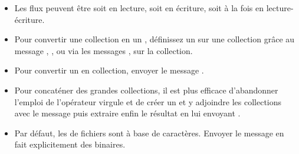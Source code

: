 \documentclass[a4paper,10pt,twoside]{book}
\begin{document}
\begin{itemize}
  \item Les flux peuvent \^etre soit en lecture, soit en écriture, soit \`a la fois en lecture-écriture.
  \item Pour convertir une collection en un \stream, d\'efinissez un \stream
sur une collection gr\^ace au message , \eg {}, ou via les messages , \etc sur la collection.
  \item Pour convertir un \stream en collection, envoyer le message .
  \item Pour concat\'ener des grandes collections, il est plus efficace d'abandonner l'emploi de l'op\'erateur virgule \ct{,} et de cr\'eer un \stream et y adjoindre les collections avec le message  puis extraire enfin le r\'esultat en lui envoyant .
  \item Par d\'efaut, les \streams de fichiers sont \`a base de caract\`eres.
Envoyer le message  en fait explicitement des \streams binaires.
\end{itemize}

\ifx\wholebook\relax\else
\end{document}
